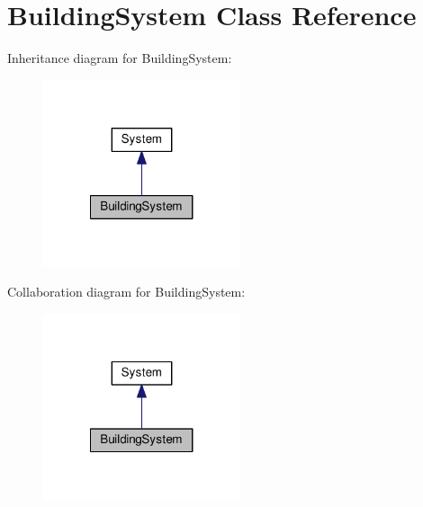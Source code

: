 \hypertarget{classBuildingSystem}{\section{Building\-System Class Reference}
\label{classBuildingSystem}
}


Inheritance diagram for Building\-System\-:
\nopagebreak
\begin{figure}[H]
\begin{center}
\leavevmode
\includegraphics[width=164pt]{classBuildingSystem__inherit__graph}
\end{center}
\end{figure}


Collaboration diagram for Building\-System\-:
\nopagebreak
\begin{figure}[H]
\begin{center}
\leavevmode
\includegraphics[width=164pt]{classBuildingSystem__coll__graph}
\end{center}
\end{figure}
